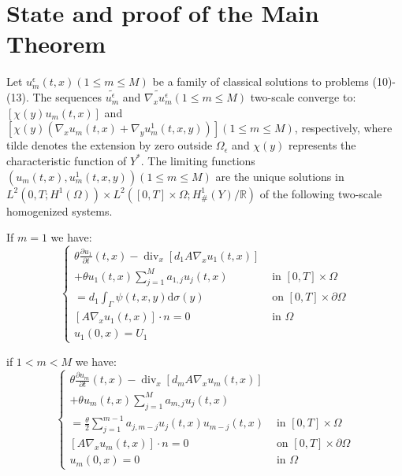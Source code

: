 \section{State and proof of the Main Theorem}
\begin{theorem} Let $u_{m}^{\epsilon}(t, x)(1 \leq m \leq M)$ be a family of classical solutions to problems (10)-(13). The sequences $\widetilde{u_{m}^{\epsilon}}$ and $\widetilde{\nabla_{x} u_{m}^{\epsilon}}(1 \leq m \leq M)$ two-scale converge to: $\left[\chi(y) u_{m}(t, x)\right]$ and $\left[\chi(y)\left(\nabla_{x} u_{m}(t, x)+\nabla_{y} u_{m}^{1}(t, x, y)\right)\right](1 \leq m \leq M)$, respectively, where tilde denotes the extension by zero outside $\Omega_{\epsilon}$ and $\chi(y)$ represents the characteristic function of $Y^{*}$. The limiting functions $\left(u_{m}(t, x), u_{m}^{1}(t, x, y)\right)(1 \leq m \leq M)$ are the unique solutions in $L^{2}\left(0, T ; H^{1}(\Omega)\right) \times L^{2}\left([0, T] \times \Omega ; H_{\#}^{1}(Y) / \mathbb{R}\right)$ of the following two-scale homogenized systems.

If $m=1$ we have:
\begin{equation}
  \begin{cases}\theta \frac{\partial u_{1}}{\partial t}(t, x)-\operatorname{div}_{x}\left[d_{1} A \nabla_{x} u_{1}(t, x)\right] & \\ +\theta u_{1}(t, x) \sum_{j=1}^{M} a_{1, j} u_{j}(t, x) & \text { in }[0, T] \times \Omega \\ =d_{1} \int_{\Gamma} \psi(t, x, y) \mathrm{d} \sigma(y) & \text { on }[0, T] \times \partial \Omega \\ {\left[A \nabla_{x} u_{1}(t, x)\right] \cdot n=0} & \text { in } \Omega \\ u_{1}(0, x)=U_{1} & \end{cases}
\label{eq 16}\end{equation}

if $1<m<M$ we have:
\begin{equation}
  \begin{cases}\theta \frac{\partial u_{m}}{\partial t}(t, x)-\operatorname{div}_{x}\left[d_{m} A \nabla_{x} u_{m}(t, x)\right] \\ +\theta u_{m}(t, x) \sum_{j=1}^{M} a_{m, j} u_{j}(t, x) & \\ =\frac{\theta}{2} \sum_{j=1}^{m-1} a_{j, m-j} u_{j}(t, x) u_{m-j}(t, x) & \text { in }[0, T] \times \Omega \\ {\left[A \nabla_{x} u_{m}(t, x)\right] \cdot n=0} & \text { on }[0, T] \times \partial \Omega \\ u_{m}(0, x)=0 & \text { in } \Omega\end{cases}
\label{eq 17}\end{equation}



\end{theorem}
